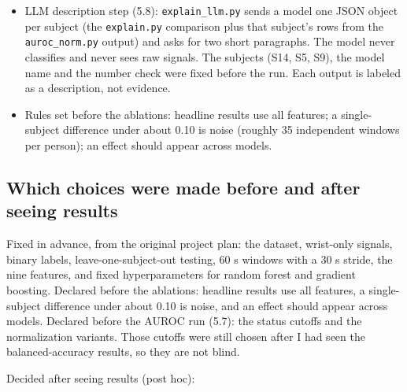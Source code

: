 \documentclass[11pt]{article}
\begin{document}
\begin{itemize}
  normalization that uses no labels: \texttt{full} (the subject's whole
  recording, which would not be available in deployment) and
  \texttt{earlyN} (the subject's first N\% of windows, at least 5, which
  is usable here because every WESAD recording starts at rest). The
  status rules were fixed before the run, along with the normalization
  variants. A subject is labeled ranking when AUROC is below 0.70,
  threshold when AUROC is at least 0.85 and the gap to the best
  threshold is at least 0.15, and mixed otherwise. I wrote the
  interpretation in 5.7 after the run.
\item
  LLM description step (5.8): \texttt{explain\_llm.py} sends a model one
  JSON object per subject (the \texttt{explain.py} comparison plus that
  subject's rows from the \texttt{auroc\_norm.py} output) and asks for
  two short paragraphs. The model never classifies and never sees raw
  signals. The subjects (S14, S5, S9), the model name and the number
  check were fixed before the run. Each output is labeled as a
  description, not evidence.
\item
  Rules set before the ablations: headline results use all features; a
  single-subject difference under about 0.10 is noise (roughly 35
  independent windows per person); an effect should appear across
  models.
\end{itemize}

\hypertarget{which-choices-were-made-before-and-after-seeing-results}{%
\subsection{Which choices were made before and after seeing
results}\label{which-choices-were-made-before-and-after-seeing-results}}

Fixed in advance, from the original project plan: the dataset,
wrist-only signals, binary labels, leave-one-subject-out testing, 60 s
windows with a 30 s stride, the nine features, and fixed hyperparameters
for random forest and gradient boosting. Declared before the ablations:
headline results use all features, a single-subject difference under
about 0.10 is noise, and an effect should appear across models. Declared
before the AUROC run (5.7): the status cutoffs and the normalization
variants. Those cutoffs were still chosen after I had seen the
balanced-accuracy results, so they are not blind.

Decided after seeing results (post hoc):
\end{document}
